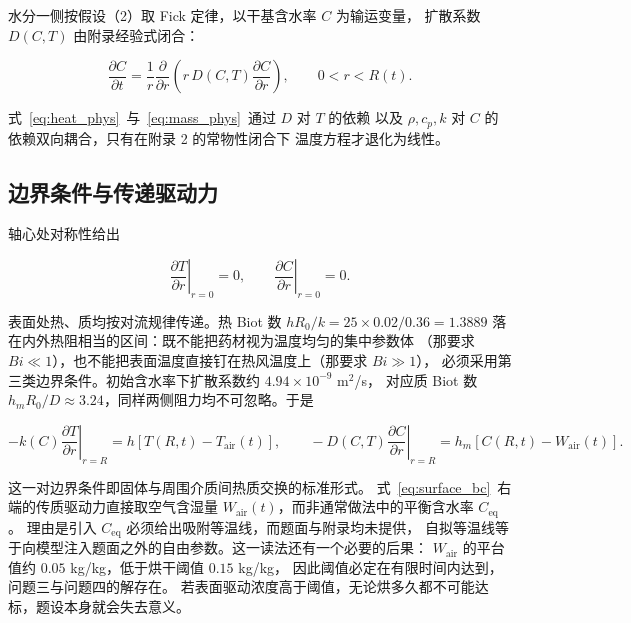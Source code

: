 水分一侧按假设（2）取 Fick 定律，以干基含水率 $C$ 为输运变量，
扩散系数 $D(C,T)$ 由附录经验式闭合：

\begin{equation}
\frac{\partial C}{\partial t}
=\frac{1}{r}\frac{\partial}{\partial r}\!\left(r\,D(C,T)\frac{\partial C}{\partial r}\right),
\qquad 0<r<R(t).
\label{eq:mass_phys}
\end{equation}

式~\eqref{eq:heat_phys}~与~\eqref{eq:mass_phys}~通过 $D$ 对 $T$ 的依赖
以及 $\rho,c_p,k$ 对 $C$ 的依赖双向耦合，只有在附录 2 的常物性闭合下
温度方程才退化为线性。

\subsection{边界条件与传递驱动力}

轴心处对称性给出

\begin{equation}
\left.\frac{\partial T}{\partial r}\right|_{r=0}=0,
\qquad
\left.\frac{\partial C}{\partial r}\right|_{r=0}=0.
\label{eq:axis_bc}
\end{equation}

表面处热、质均按对流规律传递。热 Biot 数 $hR_0/k=25\times0.02/0.36=1.3889$
落在内外热阻相当的区间：既不能把药材视为温度均匀的集中参数体
（那要求 $Bi\ll1$），也不能把表面温度直接钉在热风温度上（那要求 $Bi\gg1$），
必须采用第三类边界条件。初始含水率下扩散系数约 $4.94\times10^{-9}$ m$^2$/s，
对应质 Biot 数 $h_mR_0/D\approx3.24$，同样两侧阻力均不可忽略。于是

\begin{equation}
-k(C)\left.\frac{\partial T}{\partial r}\right|_{r=R}
=h\left[T(R,t)-T_{\mathrm{air}}(t)\right],
\qquad
-D(C,T)\left.\frac{\partial C}{\partial r}\right|_{r=R}
=h_m\left[C(R,t)-W_{\mathrm{air}}(t)\right].
\label{eq:surface_bc}
\end{equation}

这一对边界条件即固体与周围介质间热质交换的标准形式。
式~\eqref{eq:surface_bc}~右端的传质驱动力直接取空气含湿量
$W_{\mathrm{air}}(t)$，而非通常做法中的平衡含水率 $C_{\mathrm{eq}}$。
理由是引入 $C_{\mathrm{eq}}$ 必须给出吸附等温线，而题面与附录均未提供，
自拟等温线等于向模型注入题面之外的自由参数。这一读法还有一个必要的后果：
$W_{\mathrm{air}}$ 的平台值约 $0.05$ kg/kg，低于烘干阈值 $0.15$ kg/kg，
因此阈值必定在有限时间内达到，问题三与问题四的解存在。
若表面驱动浓度高于阈值，无论烘多久都不可能达标，题设本身就会失去意义。

